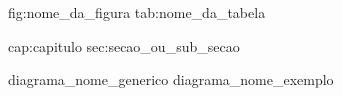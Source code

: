 fig:nome_da_figura
tab:nome_da_tabela

cap:capitulo
sec:secao_ou_sub_secao

diagrama_nome_generico
diagrama_nome_exemplo

